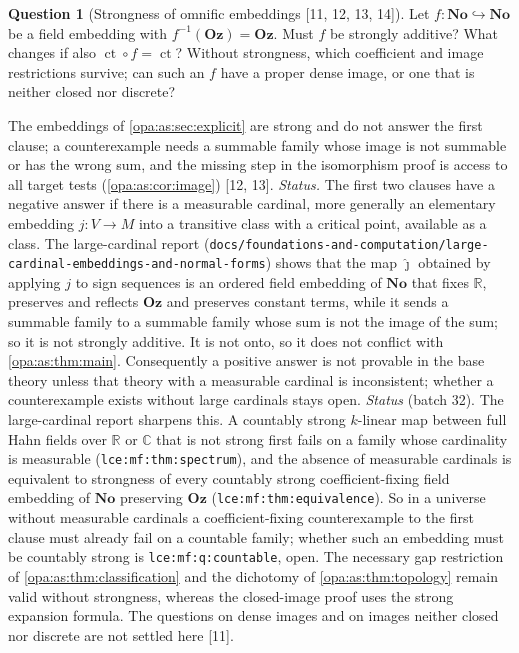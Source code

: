 \documentclass[11pt,oneside]{article}
\numberwithin{equation}{section}
\theoremstyle{definition}
\newtheorem{question}[question]{Question}
\theoremstyle{remark}
\newcommand{\No}{\mathbf{No}}
\newcommand{\Oz}{\mathbf{Oz}}
\newcommand{\R}{\mathbb R}
\newcommand{\C}{\mathbb C}
\newcommand{\ct}{\operatorname{ct}}
\newcommand{\src}[1]{\textup{\textsf{\small[#1]}}}
\newcommand{\lbl}[1]{\nolinkurl{#1}}
\newcommand{\fn}[1]{\nolinkurl{#1}}
\begin{document}
\begin{question}[Strongness of omnific embeddings \src{11, 12, 13, 14}]\label{opa:as:q:embeddingstrong}
Let $f:\No\hookrightarrow\No$ be a field embedding with $f^{-1}(\Oz)=\Oz$. Must $f$ be strongly additive? What
changes if also $\ct\circ f=\ct$? Without strongness, which coefficient and image restrictions survive; can such
an $f$ have a proper dense image, or one that is neither closed nor discrete?
\end{question}
The embeddings of \cref{opa:as:sec:explicit} are strong and do not answer the first clause; a counterexample
needs a summable family whose image is not summable or has the wrong sum, and the missing step in the isomorphism
proof is access to all target tests (\cref{opa:as:cor:image}) \src{12, 13}. \emph{Status.} The first two clauses
have a negative answer if there is a measurable cardinal, more generally an elementary embedding
$j:V\to M$ into a transitive class with a critical point, available as a class. The large-cardinal report
(\fn{docs/foundations-and-computation/large-cardinal-embeddings-and-normal-forms}) shows that the map
$\hat\jmath$ obtained by applying $j$ to sign sequences is an ordered field embedding of $\No$ that fixes $\R$,
preserves and reflects $\Oz$ and preserves constant terms, while it sends a summable family to a summable family
whose sum is not the image of the sum; so it is not strongly additive. It is not onto, so it does not conflict
with \cref{opa:as:thm:main}. Consequently a positive answer is not provable in the base theory unless that theory
with a measurable cardinal is inconsistent; whether a counterexample exists without large cardinals stays open.
\emph{Status} (batch 32). The large-cardinal report sharpens this. A countably strong $k$-linear map between
full Hahn fields over $\R$ or $\C$ that is not strong first fails on a family whose cardinality is measurable
(\lbl{lce:mf:thm:spectrum}), and the absence of measurable cardinals is equivalent to strongness of every countably
strong coefficient-fixing field embedding of $\No$ preserving $\Oz$ (\lbl{lce:mf:thm:equivalence}). So in a
universe without measurable cardinals a coefficient-fixing counterexample to the first clause must already fail on
a countable family; whether such an embedding must be countably strong is \lbl{lce:mf:q:countable}, open.
The necessary gap restriction of \cref{opa:as:thm:classification} and the dichotomy of
\cref{opa:as:thm:topology} remain valid without strongness, whereas the closed-image proof uses the strong
expansion formula. The questions on dense images and on images neither closed nor discrete are not settled here
\src{11}.
\end{document}
